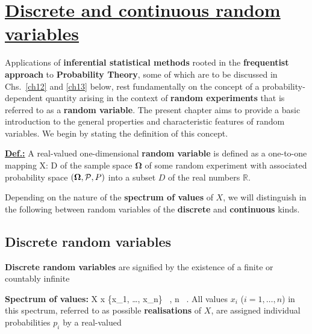 \chapter[Discrete and continuous random variables]{\href{https://www.youtube.com/watch?v=1rEczO3Jh_Y}{Discrete and continuous random
variables}}
Applications of \textbf{inferential statistical methods}
rooted in the \textbf{frequentist approach} to \textbf{Probability
Theory}, some of which are to be discussed in Chs.~\ref{ch12} and
\ref{ch13} below, rest fundamentally on the concept of a
probability-dependent quantity arising in the context of
\textbf{random experiments} that is referred to as a \textbf{random
variable}. The present chapter aims to provide a basic introduction
to the general properties and characteristic features of random
variables. We begin by stating the definition of this concept.

\medskip
\noindent
\underline{\textbf{Def.:}} A real-valued one-dimensional
\textbf{random variable} is defined as a one-to-one mapping
%
\be
X: \boldsymbol{\Omega} \rightarrow D \subseteq {}
\ee
%
of the sample space $\boldsymbol{\Omega}$ of some random 
experiment with associated probability space 
$\left(\boldsymbol{\Omega}, {\cal P}, P\right)$ into a subset $D$ 
of the real numbers $\mathbb{R}$.

\medskip
\noindent
Depending on the nature of the \textbf{spectrum of values} of $X$,
we will distinguish in the following between random 
variables of the \textbf{discrete} and \textbf{continuous} kinds.

\section[Discrete random variables]{Discrete random variables}
\textbf{Discrete random variables} are signified by the existence
of a finite or countably infinite

\medskip
\noindent
\textbf{Spectrum of values:}
%
\be
X \mapsto x \in \left\{x_{1}, \ldots, x_{n}\right\}
\subset {} \ ,
\quad\quad{}\quad n \in {} \ .
\ee
%
All values $x_{i}$ ($i=1,\ldots,n$) in this spectrum,
referred to as possible \textbf{realisations} of $X$, are assigned 
individual probabilities $p_{i}$ by a real-valued

